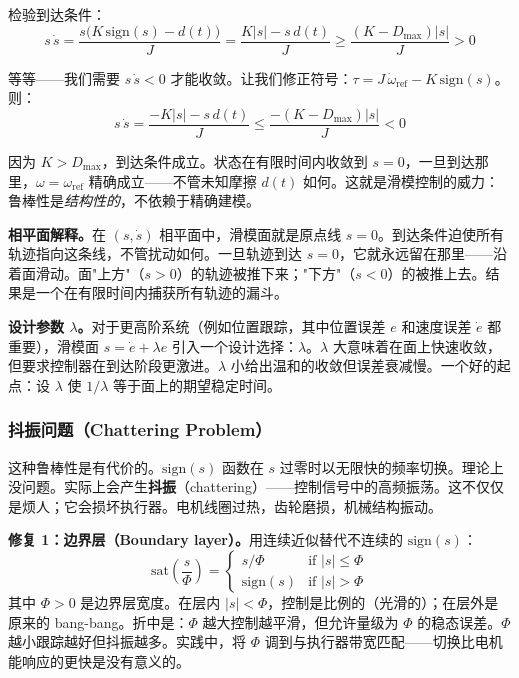 检验到达条件：
\begin{equation}
s\,\dot{s} = \frac{s\bigl(K\,\mathrm{sign}(s) - d(t)\bigr)}{J} = \frac{K|s| - s\,d(t)}{J} \geq \frac{(K - D_{\max})|s|}{J} > 0
\end{equation}

等等——我们需要 $s\,\dot{s} < 0$ 才能收敛。让我们修正符号：$\tau = J\,\dot{\omega}_{\text{ref}} - K\,\mathrm{sign}(s)$。则：
\begin{equation}
s\,\dot{s} = \frac{-K|s| - s\,d(t)}{J} \leq \frac{-(K - D_{\max})|s|}{J} < 0
\end{equation}

因为 $K > D_{\max}$，到达条件成立。状态在有限时间内收敛到 $s = 0$，一旦到达那里，$\omega = \omega_{\text{ref}}$ 精确成立——不管未知摩擦 $d(t)$ 如何。这就是滑模控制的威力：鲁棒性是\textit{结构性的}，不依赖于精确建模。

\textbf{相平面解释。}在 $(s, \dot{s})$ 相平面中，滑模面就是原点线 $s = 0$。到达条件迫使所有轨迹指向这条线，不管扰动如何。一旦轨迹到达 $s = 0$，它就永远留在那里——沿着面滑动。面"上方"（$s > 0$）的轨迹被推下来；"下方"（$s < 0$）的被推上去。结果是一个在有限时间内捕获所有轨迹的漏斗。

\textbf{设计参数 $\lambda$。}对于更高阶系统（例如位置跟踪，其中位置误差 $e$ 和速度误差 $\dot{e}$ 都重要），滑模面 $s = \dot{e} + \lambda e$ 引入一个设计选择：$\lambda$。$\lambda$ 大意味着在面上快速收敛，但要求控制器在到达阶段更激进。$\lambda$ 小给出温和的收敛但误差衰减慢。一个好的起点：设 $\lambda$ 使 $1/\lambda$ 等于面上的期望稳定时间。

\subsubsection{抖振问题（Chattering Problem）}

这种鲁棒性是有代价的。$\mathrm{sign}(s)$ 函数在 $s$ 过零时以无限快的频率切换。理论上没问题。实际上会产生\textbf{抖振}（chattering）——控制信号中的高频振荡。这不仅仅是烦人；它会损坏执行器。电机线圈过热，齿轮磨损，机械结构振动。

\textbf{修复 1：边界层（Boundary layer）。}用连续近似替代不连续的 $\mathrm{sign}(s)$：
\begin{equation}
\mathrm{sat}\!\left(\frac{s}{\Phi}\right) = \begin{cases} s/\Phi & \text{if } |s| \leq \Phi \\ \mathrm{sign}(s) & \text{if } |s| > \Phi \end{cases}
\end{equation}
其中 $\Phi > 0$ 是边界层宽度。在层内 $|s| < \Phi$，控制是比例的（光滑的）；在层外是原来的 bang-bang。折中是：$\Phi$ 越大控制越平滑，但允许量级为 $\Phi$ 的稳态误差。$\Phi$ 越小跟踪越好但抖振越多。实践中，将 $\Phi$ 调到与执行器带宽匹配——切换比电机能响应的更快是没有意义的。

